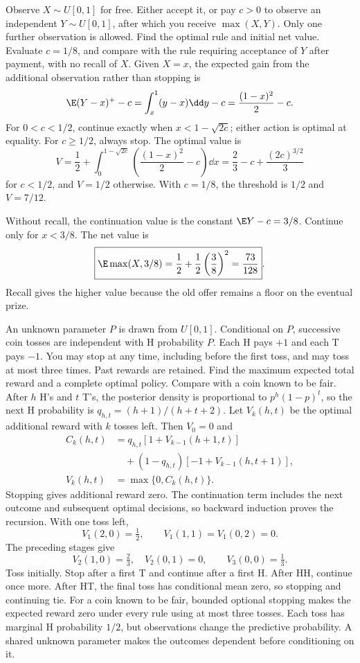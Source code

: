 Observe $X\sim U[0,1]$ for free. Either accept it, or pay $c>0$ to observe an independent $Y\sim U[0,1]$, after which you receive $\max(X,Y)$. Only one further observation is allowed. Find the optimal rule and initial net value. Evaluate $c=1/8$, and compare with the rule requiring acceptance of $Y$ after payment, with no recall of $X$.
\solution Given $X=x$, the expected gain from the additional observation rather than stopping is
\[
 \E(Y-x)^+-c=\int_x^1(y-x)\dd y-c=\frac{(1-x)^2}{2}-c.
\]
For $0<c<1/2$, continue exactly when $x<1-\sqrt{2c}$; either action is optimal at equality. For $c\ge1/2$, always stop. The optimal value is
\[
 V=\frac12+\int_0^{1-\sqrt{2c}}
 \left(\frac{(1-x)^2}{2}-c\right)\dd x
 =\frac23-c+\frac{(2c)^{3/2}}3
\]
for $c<1/2$, and $V=1/2$ otherwise. With $c=1/8$, the threshold is $1/2$ and $\boxed{V=7/12}$.

Without recall, the continuation value is the constant $\E Y-c=3/8$. Continue only for $x<3/8$. The net value is
\[
 \boxed{\E\max(X,3/8)=\frac12+\frac12\left(\frac38\right)^2
 =\frac{73}{128}}.
\]
Recall gives the higher value because the old offer remains a floor on the eventual prize.

An unknown parameter $P$ is drawn from $U[0,1]$. Conditional on $P$, successive coin tosses are independent with H probability $P$. Each H pays $+1$ and each T pays $-1$. You may stop at any time, including before the first toss, and may toss at most three times. Past rewards are retained. Find the maximum expected total reward and a complete optimal policy. Compare with a coin known to be fair.
\solution After $h$ H's and $t$ T's, the posterior density is proportional to $p^h(1-p)^t$, so the next H probability is $q_{h,t}=(h+1)/(h+t+2)$. Let $V_k(h,t)$ be the optimal additional reward with $k$ tosses left. Then $V_0=0$ and
\[
 \begin{aligned}
 C_k(h,t)&=q_{h,t}[1+V_{k-1}(h+1,t)]\\
 &\quad +(1-q_{h,t})[-1+V_{k-1}(h,t+1)],\\
 V_k(h,t)&=\max\{0,C_k(h,t)\}.
 \end{aligned}
\]
Stopping gives additional reward zero. The continuation term includes the next outcome and subsequent optimal decisions, so backward induction proves the recursion. With one toss left,
\[
 V_1(2,0)=\tfrac12,\qquad V_1(1,1)=V_1(0,2)=0.
\]
The preceding stages give
\[
 V_2(1,0)=\tfrac23,\quad V_2(0,1)=0,\qquad
 \boxed{V_3(0,0)=\tfrac13}.
\]
Toss initially. Stop after a first T and continue after a first H. After HH, continue once more. After HT, the final toss has conditional mean zero, so stopping and continuing tie. For a coin known to be fair, bounded optional stopping makes the expected reward zero under every rule using at most three tosses.
\insight Each toss has marginal H probability $1/2$, but observations change the predictive probability. A shared unknown parameter makes the outcomes dependent before conditioning on it.

